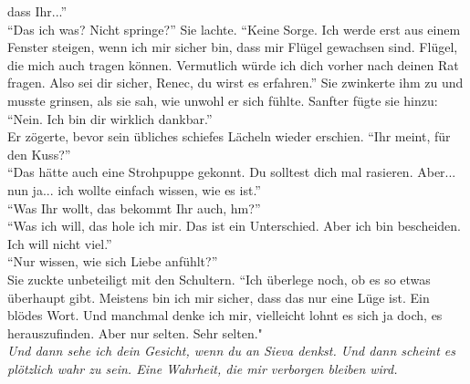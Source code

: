 dass Ihr...'' \\
``Das ich was? Nicht springe?'' Sie lachte. ``Keine Sorge. Ich werde erst aus einem Fenster 
steigen, wenn ich mir sicher bin, dass mir Flügel gewachsen sind. Flügel, die mich auch tragen 
können. Vermutlich würde ich dich vorher nach deinen Rat fragen. Also sei dir sicher, Renec, du 
wirst es erfahren.'' Sie zwinkerte ihm zu und musste grinsen, als sie sah, wie unwohl er sich 
fühlte. Sanfter fügte sie hinzu: ``Nein. Ich bin dir wirklich dankbar.''\\
Er zögerte, bevor sein übliches schiefes Lächeln wieder erschien. ``Ihr meint, für den Kuss?''\\
``Das hätte auch eine Strohpuppe gekonnt. Du solltest dich mal rasieren. Aber... nun ja... ich 
wollte einfach wissen, wie es ist.''\\
``Was Ihr wollt, das bekommt Ihr auch, hm?''\\
``Was ich will, das hole ich mir. Das ist ein Unterschied. Aber ich bin bescheiden. Ich will nicht 
viel.''\\
``Nur wissen, wie sich Liebe anfühlt?''\\
Sie zuckte unbeteiligt mit den Schultern. ``Ich überlege noch, ob es so etwas überhaupt gibt. 
Meistens bin ich mir sicher, dass das nur eine Lüge ist. Ein blödes Wort. Und manchmal denke ich 
mir, vielleicht lohnt es sich ja doch, es herauszufinden. Aber nur selten. Sehr selten."\\
\textit{Und dann sehe ich dein Gesicht, wenn du an Sieva denkst. Und dann scheint es plötzlich wahr 
zu sein. Eine Wahrheit, die mir verborgen bleiben wird.}
